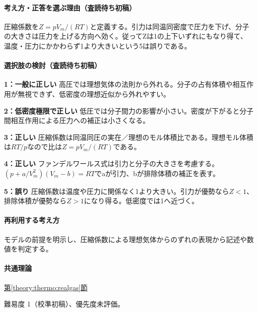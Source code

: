 \paragraph{考え方・正答を選ぶ理由（査読待ち初稿）} 圧縮係数を\(Z=pV_m/(RT)\)と定義する。引力は同温同密度で圧力を下げ、分子の大きさは圧力を上げる方向へ効く。従ってZは1の上下いずれにもなり得て、温度・圧力にかかわらず1より大きいという5は誤りである。

\paragraph{選択肢の検討（査読待ち初稿）}\mbox{}\par

\noindent\textbf{1：一般に正しい} 高圧では理想気体の法則から外れる。分子の占有体積や相互作用が無視できず、低密度の理想近似から外れやすい。\par

\noindent\textbf{2：低密度極限で正しい} 低圧では分子間力の影響が小さい。密度が下がると分子間相互作用による圧力への補正は小さくなる。\par

\noindent\textbf{3：正しい} 圧縮係数は同温同圧の実在／理想のモル体積比である。理想モル体積は\(RT/p\)なので比は\(Z=pV_m/(RT)\)である。\par

\noindent\textbf{4：正しい} ファンデルワールス式は引力と分子の大きさを考慮する。\((p+a/V_m^2)(V_m-b)=RT\)でaが引力、bが排除体積の補正を表す。\par

\noindent\textbf{5：誤り} 圧縮係数は温度や圧力に関係なく1より大きい。引力が優勢なら\(Z<1\)、排除体積が優勢なら\(Z>1\)になり得る。低密度では1へ近づく。\par

\paragraph{再利用する考え方} モデルの前提を明示し、圧縮係数による理想気体からのずれの表現から記述や数値を判定する。

\paragraph{共通理論} \hyperref[theory:thermo:realgas]{第\ref*{theory:thermo:realgas}節}

\par 難易度 1（校準初稿）、優先度未評価。

